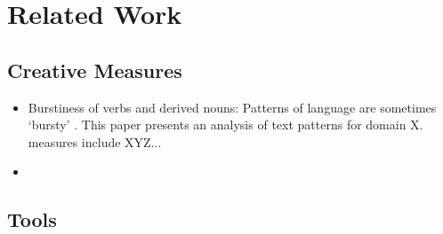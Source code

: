 \chapter{Related Work}

\section{Creative Measures}
\begin{itemize}
    \item Burstiness of verbs and derived nouns: Patterns of language are sometimes `bursty' \cite{pierrehumbert2012burstiness}. This paper presents an analysis of text patterns for domain X. measures include XYZ...
    \item 
\end{itemize}

\section{Tools}
